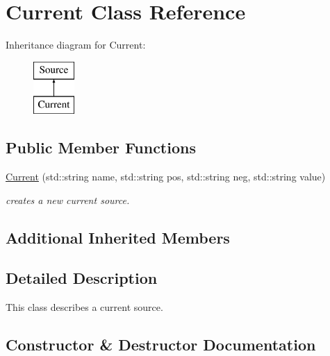 \hypertarget{class_s_p_i_c_e_1_1_current}{}\section{Current Class Reference}
\label{class_s_p_i_c_e_1_1_current}
Inheritance diagram for Current\+:\begin{figure}[H]
\begin{center}
\leavevmode
\includegraphics[height=2.000000cm]{class_s_p_i_c_e_1_1_current}
\end{center}
\end{figure}
\subsection*{Public Member Functions}
\begin{DoxyCompactItemize}
\item 
\hyperlink{class_s_p_i_c_e_1_1_current_a798deca3f9017adbf1bb2ab5ca2f2f5e}{Current} (std\+::string name, std\+::string pos, std\+::string neg, std\+::string value)
\begin{DoxyCompactList}\small\item\em creates a new current source. \end{DoxyCompactList}\end{DoxyCompactItemize}
\subsection*{Additional Inherited Members}


\subsection{Detailed Description}
This class describes a current source. 

\subsection{Constructor \& Destructor Documentation}
\mbox{\label{class_s_p_i_c_e_1_1_current_a798deca3f9017adbf1bb2ab5ca2f2f5e}} 
